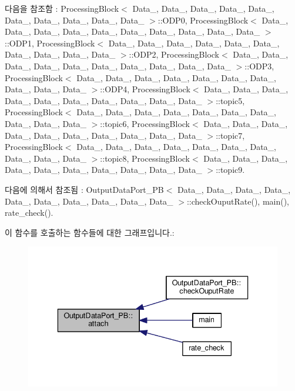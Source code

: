 다음을 참조함 \+:  Processing\+Block$<$ Data\+\_, Data\+\_, Data\+\_, Data\+\_, Data\+\_, Data\+\_, Data\+\_, Data\+\_, Data\+\_, Data\+\_ $>$\+::\+O\+D\+P0, Processing\+Block$<$ Data\+\_, Data\+\_, Data\+\_, Data\+\_, Data\+\_, Data\+\_, Data\+\_, Data\+\_, Data\+\_, Data\+\_ $>$\+::\+O\+D\+P1, Processing\+Block$<$ Data\+\_, Data\+\_, Data\+\_, Data\+\_, Data\+\_, Data\+\_, Data\+\_, Data\+\_, Data\+\_, Data\+\_ $>$\+::\+O\+D\+P2, Processing\+Block$<$ Data\+\_, Data\+\_, Data\+\_, Data\+\_, Data\+\_, Data\+\_, Data\+\_, Data\+\_, Data\+\_, Data\+\_ $>$\+::\+O\+D\+P3, Processing\+Block$<$ Data\+\_, Data\+\_, Data\+\_, Data\+\_, Data\+\_, Data\+\_, Data\+\_, Data\+\_, Data\+\_, Data\+\_ $>$\+::\+O\+D\+P4, Processing\+Block$<$ Data\+\_, Data\+\_, Data\+\_, Data\+\_, Data\+\_, Data\+\_, Data\+\_, Data\+\_, Data\+\_, Data\+\_ $>$\+::topic5, Processing\+Block$<$ Data\+\_, Data\+\_, Data\+\_, Data\+\_, Data\+\_, Data\+\_, Data\+\_, Data\+\_, Data\+\_, Data\+\_ $>$\+::topic6, Processing\+Block$<$ Data\+\_, Data\+\_, Data\+\_, Data\+\_, Data\+\_, Data\+\_, Data\+\_, Data\+\_, Data\+\_, Data\+\_ $>$\+::topic7, Processing\+Block$<$ Data\+\_, Data\+\_, Data\+\_, Data\+\_, Data\+\_, Data\+\_, Data\+\_, Data\+\_, Data\+\_, Data\+\_ $>$\+::topic8, Processing\+Block$<$ Data\+\_, Data\+\_, Data\+\_, Data\+\_, Data\+\_, Data\+\_, Data\+\_, Data\+\_, Data\+\_, Data\+\_ $>$\+::topic9.



다음에 의해서 참조됨 \+:  Output\+Data\+Port\+\_\+\+P\+B$<$ Data\+\_, Data\+\_, Data\+\_, Data\+\_, Data\+\_, Data\+\_, Data\+\_, Data\+\_, Data\+\_, Data\+\_ $>$\+::check\+Ouput\+Rate(), main(), rate\+\_\+check().



이 함수를 호출하는 함수들에 대한 그래프입니다.\+:\nopagebreak
\begin{figure}[H]
\begin{center}
\leavevmode
\includegraphics[width=336pt]{classOutputDataPort__PB_ac1c7e483c5d8d5c6b9891463b81e41a4_icgraph}
\end{center}
\end{figure}


